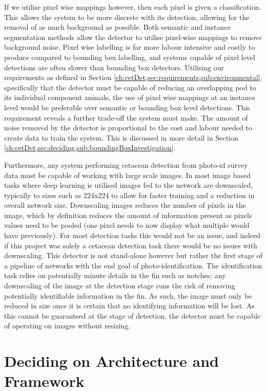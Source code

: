  If we utilise pixel wise mappings however, then each pixel is given a classification. This allows the system to be more discrete with its detection, allowing for the removal of as much background as possible. Both semantic and instance segmentation methods allow the detector to utilise pixel-wise mappings to remove background noise. Pixel wise labelling is far more labour intensive and costly to produce compared to bounding box labelling, and systems capable of pixel level detections are often slower than bounding box detectors. Utilising our requirements as defined in Section \ref{ch:cetDet,sec:requirements,sub:environmental}, specifically that the detector must be capable of reducing an overlapping pod to its individual component animals, the use of pixel wise mappings at an instance level would be preferable over semantic or bounding box level detections. This requirement reveals a further trade-off the system must make. The amount of noise removed by the detector is proportional to the cost and labour needed to create data to train the system. This is discussed in more detail in Section \ref{ch:cetDet,sec:deciding,sub:boundingBoxInvestigation}.
 
 Furthermore, any system performing cetacean detection from photo-id survey data must be capable of working with large scale images. In most image based tasks where deep learning is utilised images fed to the network are downscaled, typically to sizes such as 224x224 to allow for faster training and a reduction in overall network size. Downscaling images reduces the number of pixels in the image, which by definition reduces the amount of information present as pixels values need to be pooled (one pixel needs to now display what multiple would have previously). For most detection tasks this would not be an issue, and indeed if this project was solely a cetacean detection task there would be no issues with downscaling. This detector is not stand-alone however but rather the first stage of a pipeline of networks with the end goal of photo-identification. The identification task relies on potentially minute details in the fin such as notches; any downscaling of the image at the detection stage runs the risk of removing potentially identifiable information in the fin. As such, the image must only be reduced in size once it is certain that no identifying information will be lost. As this cannot be guaranteed at the stage of detection, the detector must be capable of operating on images without resizing.
 
\section{Deciding on Architecture and Framework}\label{ch:cetDet,sec:deciding}

